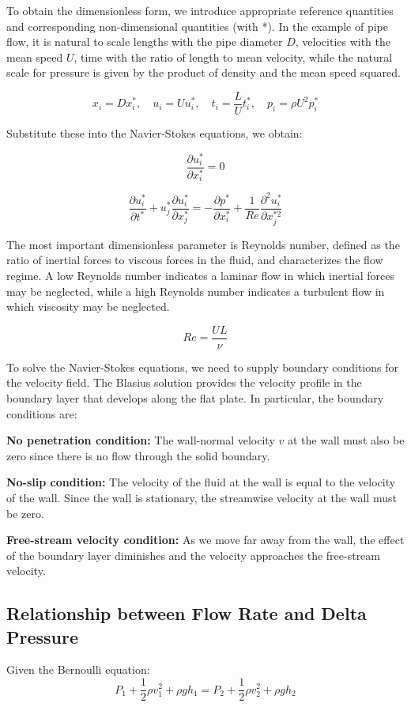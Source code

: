 \documentclass{article}
\begin{document}
To obtain the dimensionless form, we introduce appropriate reference quantities and corresponding non-dimensional quantities (with *). In the example of pipe flow, it is natural to scale lengths with the pipe diameter $D$, velocities with the mean speed $U$, time with the ratio of length to mean velocity, while the natural scale for pressure is given by the product of density and the mean speed squared.

\[
x_i = D x_i^*, \quad u_i = U u_i^*, \quad t_i = \frac{L}{U} t_i^*, \quad p_i = \rho U^2 p_i^*
\]

Substitute these into the Navier-Stokes equations, we obtain:

\[
\frac{\partial u_i^*}{\partial x_i^*} = 0
\]

\[
\frac{\partial u_i^*}{\partial t^*} + u_j^* \frac{\partial u_i^*}{\partial x_j^*} = - \frac{\partial p^*}{\partial x_i^*} + \frac{1}{Re} \frac{\partial^2 u_i^*}{\partial x_j^{*2}}
\]

The most important dimensionless parameter is Reynolds number, defined as the ratio of inertial forces to viscous forces in the fluid, and characterizes the flow regime. A low Reynolds number indicates a laminar flow in which inertial forces may be neglected, while a high Reynolds number indicates a turbulent flow in which viscosity may be neglected.

\[
Re = \frac{UL}{\nu}
\]

To solve the Navier-Stokes equations, we need to supply boundary conditions for the velocity field. The Blasius solution provides the velocity profile in the boundary layer that develops along the flat plate. In particular, the boundary conditions are:

\textbf{No penetration condition:} The wall-normal velocity $v$ at the wall must also be zero since there is no flow through the solid boundary.

\textbf{No-slip condition:} The velocity of the fluid at the wall is equal to the velocity of the wall. Since the wall is stationary, the streamwise velocity at the wall must be zero.

\textbf{Free-stream velocity condition:} As we move far away from the wall, the effect of the boundary layer diminishes and the velocity approaches the free-stream velocity.







\subsection{Relationship between Flow Rate and Delta Pressure}
Given the Bernoulli equation:
\begin{equation}
P_1 + \frac{1}{2} \rho v_1^2 + \rho gh_1 = P_2 + \frac{1}{2} \rho v_2^2 + \rho gh_2
\end{equation}
\end{document}
